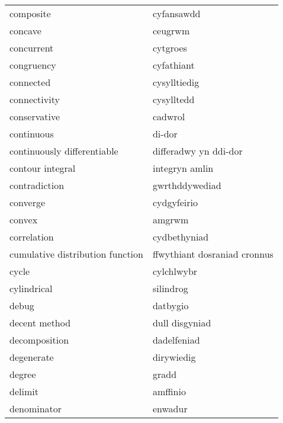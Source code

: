 \begin{supertabular}{p{0.22\textwidth}p{0.22\textwidth}}
                        composite &                       cyfansawdd \\
                          concave &                          ceugrwm \\
                       concurrent &                         cytgroes \\
                       congruency &                       cyfathiant \\
                        connected &                     cysylltiedig \\
                     connectivity &                       cysylltedd \\
                     conservative &                          cadwrol \\
                       continuous &                           di-dor \\
      continuously differentiable &            differadwy yn ddi-dor \\
                 contour integral &                   integryn amlin \\
                    contradiction &                   gwrthddywediad \\
                         converge &                      cydgyfeirio \\
                           convex &                           amgrwm \\
                      correlation &                     cydbethyniad \\
 cumulative distribution function &     ffwythiant dosraniad cronnus \\
                            cycle &                       cylchlwybr \\
                      cylindrical &                        silindrog \\
                            debug &                         datbygio \\
                    decent method &                   dull disgyniad \\
                    decomposition &                      dadelfeniad \\
                       degenerate &                       dirywiedig \\
                           degree &                            gradd \\
                          delimit &                         amffinio \\
                      denominator &                          enwadur \\

\end{supertabular}
